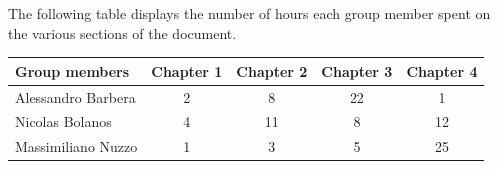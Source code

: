 The following table displays the number of hours each group member spent on the various sections of the document.


\begin{table}[ht]
\begin{tabular}{|l|c|c|c|c|}
\hline
\textbf{Group members}      & \multicolumn{1}{l|}{\textbf{Chapter 1}} & \multicolumn{1}{l|}{\textbf{Chapter 2}} & \multicolumn{1}{l|}{\textbf{Chapter 3}} & \multicolumn{1}{l|}{\textbf{Chapter 4}} \\ \hline
Alessandro Barbera & 2                              & 8                              & 22                              & 1                              \\ \hline
Nicolas Bolanos    & 4                              & 11                              & 8                              & 12                              \\ \hline
Massimiliano Nuzzo & 1                              & 3                              & 5                              & 25                              \\ \hline
\end{tabular}
\end{table}